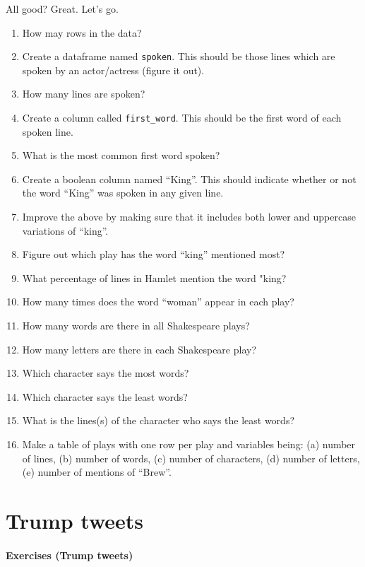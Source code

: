 \documentclass[
]{book}
\begin{document}
All good? Great. Let's go.

\begin{enumerate}
\def\labelenumi{\arabic{enumi}.}
\item
  How may rows in the data?
\item
  Create a dataframe named \texttt{spoken}. This should be those lines which are spoken by an actor/actress (figure it out).
\item
  How many lines are spoken?
\item
  Create a column called \texttt{first\_word}. This should be the first word of each spoken line.
\item
  What is the most common first word spoken?
\item
  Create a boolean column named ``King''. This should indicate whether or not the word ``King'' was spoken in any given line.
\item
  Improve the above by making sure that it includes both lower and uppercase variations of ``king''.
\item
  Figure out which play has the word ``king'' mentioned most?
\item
  What percentage of lines in Hamlet mention the word "king?
\item
  How many times does the word ``woman'' appear in each play?
\item
  How many words are there in all Shakespeare plays?
\item
  How many letters are there in each Shakespeare play?
\item
  Which character says the most words?
\item
  Which character says the least words?
\item
  What is the lines(s) of the character who says the least words?
\item
  Make a table of plays with one row per play and variables being: (a) number of lines, (b) number of words, (c) number of characters, (d) number of letters, (e) number of mentions of ``Brew''.
\end{enumerate}

\hypertarget{trump}{%
\chapter{Trump tweets}\label{trump}}

\hypertarget{exercises-trump-tweets}{%
\subsubsection*{Exercises (Trump tweets)}\label{exercises-trump-tweets}}
\end{document}
